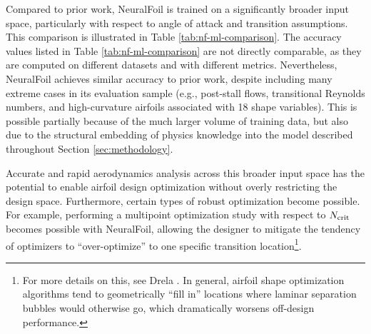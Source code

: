     Compared to prior work, NeuralFoil is trained on a significantly broader input space, particularly with respect to angle of attack and transition assumptions. This comparison is illustrated in Table \ref{tab:nf-ml-comparison}. The accuracy values listed in Table \ref{tab:nf-ml-comparison} are not directly comparable, as they are computed on different datasets and with different metrics. Nevertheless, NeuralFoil achieves similar accuracy to prior work, despite including many extreme cases in its evaluation sample (e.g., post-stall flows, transitional Reynolds numbers, and high-curvature airfoils associated with 18 shape variables). This is possible partially because of the much larger volume of training data, but also due to the structural embedding of physics knowledge into the model described throughout Section \ref{sec:methodology}.

    Accurate and rapid aerodynamics analysis across this broader input space has the potential to enable airfoil design optimization without overly restricting the design space. Furthermore, certain types of robust optimization become possible. For example, performing a multipoint optimization study with respect to $N_{\rm crit}$ becomes possible with NeuralFoil, allowing the designer to mitigate the tendency of optimizers to ``over-optimize'' to one specific transition location\footnote{For more details on this, see Drela \cite{drela_pros_1998}. In general, airfoil shape optimization algorithms tend to geometrically ``fill in'' locations where laminar separation bubbles would otherwise go, which dramatically worsens off-design performance.}.


